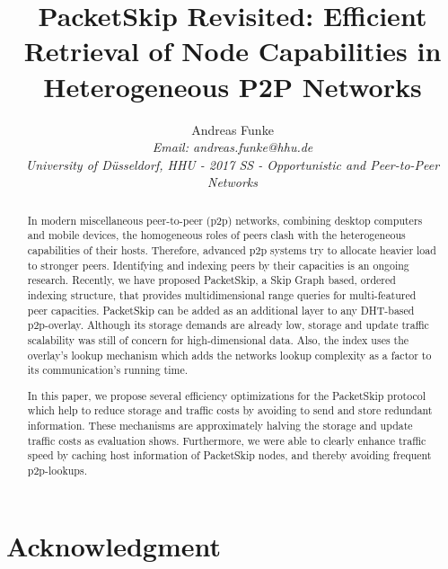 \documentclass[conference,10pt,letterpaper,final]{IEEEtran}
\begin{document}
\title{PacketSkip Revisited: Efficient Retrieval of Node Capabilities in Heterogeneous P2P Networks}


\author{Andreas Funke \\
 \textit{Email: andreas.funke@hhu.de}\\
 \textit{University of D\"usseldorf, HHU - 2017 SS - Opportunistic and Peer-to-Peer Networks} \\
 }


\maketitle
\thispagestyle{empty}

\begin{abstract}
In modern miscellaneous peer-to-peer (p2p) networks, combining desktop computers and mobile devices, the homogeneous roles of peers clash with the heterogeneous capabilities of their hosts. Therefore, advanced p2p systems try to allocate heavier load to stronger peers. Identifying and indexing peers by their capacities is an ongoing research. Recently, we have proposed PacketSkip, a Skip Graph based, ordered indexing structure, that provides multidimensional range queries for multi-featured peer capacities. PacketSkip can be added as an additional layer to any DHT-based p2p-overlay. Although its storage demands are already low, storage and update traffic scalability was still of concern for high-dimensional data. Also, the index uses the overlay's lookup mechanism which adds the networks lookup complexity as a factor to its communication's running time.

In this paper, we propose several efficiency optimizations for the PacketSkip protocol which help to reduce storage and traffic costs by avoiding to send and store redundant information. These mechanisms are approximately halving the storage and update traffic costs as evaluation shows. Furthermore, we were able to clearly enhance traffic speed by caching host information of PacketSkip nodes, and thereby avoiding frequent p2p-lookups.
\end{abstract}










\section*{Acknowledgment}
\end{document}
